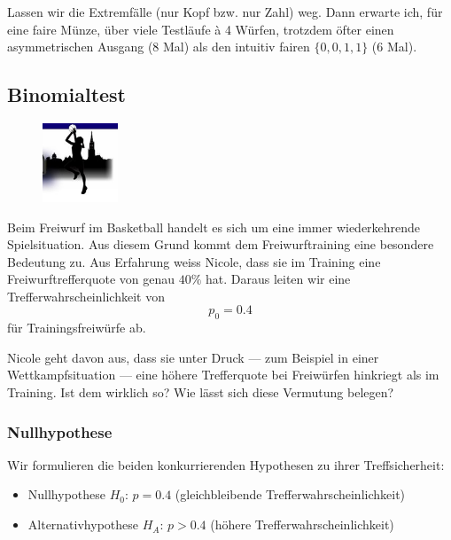 \documentclass[%
11pt,%
twoside,%
titlepage,%
german,%
headsepline%
]{scrartcl}
\begin{document}
Lassen wir die Extremfälle (nur Kopf bzw. nur Zahl) weg. Dann erwarte ich, für eine faire Münze, über viele Testläufe à 4 Würfen, trotzdem öfter einen asymmetrischen Ausgang (8 Mal) als den intuitiv fairen $\{0,0,1,1\}$ (6 Mal).

\subsection{Binomialtest}\label{subsec:bspfreiw}

\begin{figure}
  \begin{center}
    \includegraphics[width=0.2\textwidth]{pictures/bcfemina}
  \end{center}
\end{figure}

Beim Freiwurf im Basketball handelt es sich um eine immer wiederkehrende Spielsituation. Aus diesem Grund kommt dem Freiwurftraining eine besondere Bedeutung zu. Aus Erfahrung weiss Nicole, dass sie im Training eine Freiwurftrefferquote von genau $40\%$ hat. Daraus leiten wir eine Trefferwahrscheinlichkeit von
$$p_0=0.4$$
für Trainingsfreiwürfe ab.

Nicole geht davon aus, dass sie unter Druck --- zum Beispiel in einer Wettkampfsituation --- eine höhere Trefferquote bei Freiwürfen hinkriegt als im Training. Ist dem wirklich so? Wie lässt sich diese Vermutung belegen?

\subsubsection{Nullhypothese}

Wir formulieren die beiden konkurrierenden Hypothesen zu ihrer Treffsicherheit:

\begin{itemize}
\item Nullhypothese $H_0$: $p=0.4$ (gleichbleibende Trefferwahrscheinlichkeit)
\item Alternativhypothese $H_A$: $p>0.4$ (höhere Trefferwahrscheinlichkeit)
\end{itemize}
\end{document}
